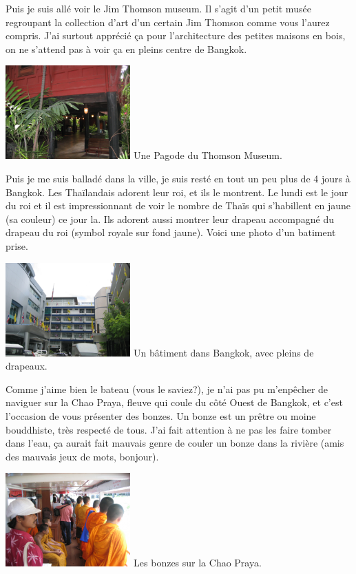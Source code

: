 \begin{multicols}{2}
Puis je suis allé voir le Jim Thomson museum. Il s'agit d'un petit musée regroupant la collection d'art d'un certain Jim Thomson comme vous l'aurez compris. J'ai surtout apprécié ça pour l'architecture des petites maisons en bois, on ne s'attend pas à voir ça en pleins centre de Bangkok.

\hspace*{-0.65cm}
\includegraphics[width=4.8cm]{articles/Bangkok/1338.jpg}
Une Pagode du Thomson Museum.

Puis je me suis balladé dans la ville, je suis resté en tout un peu plus de 4 jours à Bangkok. Les Thaïlandais adorent leur roi, et ils le montrent. Le lundi est le jour du roi et il est impressionnant de voir le nombre de Thaïs qui s'habillent en jaune (sa couleur) ce jour la. Ils adorent aussi montrer leur drapeau accompagné du drapeau du roi (symbol royale sur fond jaune). Voici une photo d'un batiment prise.

\hspace*{-0.65cm}
\includegraphics[width=4.8cm]{articles/Bangkok/1395.jpg}
Un bâtiment dans Bangkok, avec pleins de drapeaux.

Comme j'aime bien le bateau (vous le saviez?), je n'ai pas pu m'enpêcher de naviguer sur la Chao Praya, fleuve qui coule du côté Ouest de Bangkok, et c'est l'occasion de vous présenter des bonzes. Un bonze est un prêtre ou moine bouddhiste, très respecté de tous. J'ai fait attention à ne pas les faire tomber dans l'eau, ça aurait fait mauvais genre de couler un bonze dans la rivière (amis des mauvais jeux de mots, bonjour).

\hspace*{-0.65cm}
\includegraphics[width=4.8cm]{articles/Bangkok/1396.jpg}
Les bonzes sur la Chao Praya.


\end{multicols}

